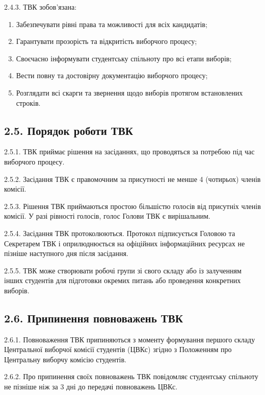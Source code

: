     2.4.3. ТВК зобов'язана:

        \begin{enumerate}[label=\alph*)]
            \item Забезпечувати рівні права та можливості для всіх кандидатів;
            \item Гарантувати прозорість та відкритість виборчого процесу;
            \item Своєчасно інформувати студентську спільноту про всі етапи виборів;
            \item Вести повну та достовірну документацію виборчого процесу;
            \item Розглядати всі скарги та звернення щодо виборів протягом встановлених строків.
        \end{enumerate}

\subsection*{2.5. Порядок роботи ТВК}
    2.5.1. ТВК приймає рішення на засіданнях, що проводяться за потребою під час виборчого процесу.

    2.5.2. Засідання ТВК є правомочним за присутності не менше 4 (чотирьох) членів комісії.

    2.5.3. Рішення ТВК приймаються простою більшістю голосів від присутніх членів комісії. У разі рівності голосів, голос Голови ТВК є вирішальним.

    2.5.4. Засідання ТВК протоколюються. Протокол підписується Головою та Секретарем ТВК і оприлюднюється на офіційних інформаційних ресурсах не пізніше наступного дня після засідання.

    2.5.5. ТВК може створювати робочі групи зі свого складу або із залученням інших студентів для підготовки окремих питань або проведення конкретних виборів.

\subsection*{2.6. Припинення повноважень ТВК}
    2.6.1. Повноваження ТВК припиняються з моменту формування першого складу Центральної виборчої комісії студентів (ЦВКс) згідно з Положенням про Центральну виборчу комісію студентів.

    2.6.2. Про припинення своїх повноважень ТВК повідомляє студентську спільноту не пізніше ніж за 3 дні до передачі повноважень ЦВКс.


